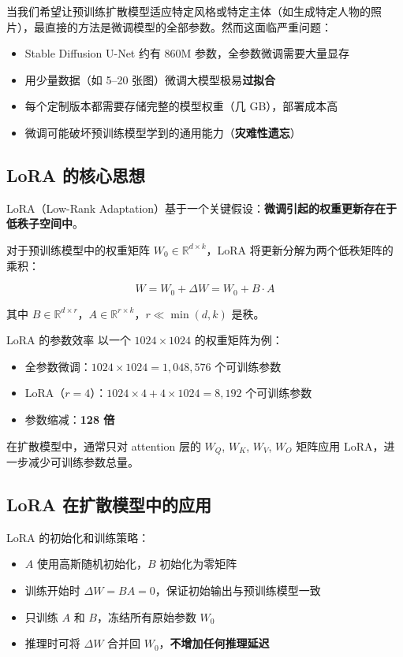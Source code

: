 \documentclass[a4paper]{article}
\begin{document}
当我们希望让预训练扩散模型适应特定风格或特定主体（如生成特定人物的照片），最直接的方法是微调模型的全部参数。然而这面临严重问题：

\begin{itemize}
    \item Stable Diffusion U-Net 约有 860M 参数，全参数微调需要大量显存
    \item 用少量数据（如 5--20 张图）微调大模型极易\textbf{过拟合}
    \item 每个定制版本都需要存储完整的模型权重（几 GB），部署成本高
    \item 微调可能破坏预训练模型学到的通用能力（\textbf{灾难性遗忘}）
\end{itemize}

\subsection{LoRA 的核心思想}

LoRA（Low-Rank Adaptation）基于一个关键假设：\textbf{微调引起的权重更新存在于低秩子空间中}。

对于预训练模型中的权重矩阵 $W_0 \in \mathbb{R}^{d \times k}$，LoRA 将更新分解为两个低秩矩阵的乘积：

$$
W = W_0 + \Delta W = W_0 + B \cdot A
$$

其中 $B \in \mathbb{R}^{d \times r}$，$A \in \mathbb{R}^{r \times k}$，$r \ll \min(d, k)$ 是秩。

\begin{importantbox}{LoRA 的参数效率}
以一个 $1024 \times 1024$ 的权重矩阵为例：
\begin{itemize}
    \item 全参数微调：$1024 \times 1024 = 1,048,576$ 个可训练参数
    \item LoRA（$r=4$）：$1024 \times 4 + 4 \times 1024 = 8,192$ 个可训练参数
    \item 参数缩减：\textbf{128 倍}
\end{itemize}
在扩散模型中，通常只对 attention 层的 $W_Q$, $W_K$, $W_V$, $W_O$ 矩阵应用 LoRA，进一步减少可训练参数总量。
\end{importantbox}

\subsection{LoRA 在扩散模型中的应用}

LoRA 的初始化和训练策略：

\begin{itemize}
    \item $A$ 使用高斯随机初始化，$B$ 初始化为零矩阵
    \item 训练开始时 $\Delta W = BA = 0$，保证初始输出与预训练模型一致
    \item 只训练 $A$ 和 $B$，冻结所有原始参数 $W_0$
    \item 推理时可将 $\Delta W$ 合并回 $W_0$，\textbf{不增加任何推理延迟}
\end{itemize}
\end{document}
